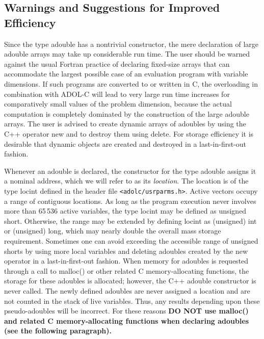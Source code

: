 \documentclass[11pt,twoside]{article}
\begin{document}
\subsection{Warnings and Suggestions for Improved Efficiency}
\label{WarSug}
%
Since the type {\sf adouble} has a nontrivial constructor,
the mere declaration of large {\sf adouble} arrays may take up
considerable run time. The user should be warned against
the usual Fortran practice of declaring fixed-size arrays
that can accommodate the largest possible case of an evaluation program
with variable dimensions. If such programs are converted to or written
in C, the overloading in combination with ADOL-C will lead to very
large run time increases for comparatively small values of the
problem dimension, because the actual computation is completely
dominated by the construction of the large {\sf adouble} arrays.
The user is advised to 
create dynamic arrays of
{\sf adouble}s by using the C++ operator {\sf new} and to destroy them
using {\sf delete}. For storage efficiency it is desirable that
dynamic objects are created and destroyed in a last-in-first-out
fashion. 

Whenever an {\sf adouble} is declared, the constructor for the type
{\sf adouble} assigns it a nominal address, which we will refer to as
its  {\em location}.  The location is of the type {\sf locint} defined
in the header file \verb=<adolc/usrparms.h>=. Active vectors occupy
a range of contiguous locations. As long as the program execution
never involves more than 65$\,$536 active variables, the type {\sf locint}
may be defined as {\sf unsigned short}. Otherwise, the range may be
extended by defining {\sf locint} as {\sf (unsigned) int} or
{\sf (unsigned) long}, which may nearly double
the overall mass storage requirement. Sometimes one can avoid exceeding
the accessible range of {\sf unsigned short}s by using more local variables and deleting
{\sf adouble}s  created by the new operator in a
last-in-first-out
fashion.  When memory for {\sf adouble}s is requested through a call to
{\sf malloc()} or other related C memory-allocating
functions, the storage for these {\sf adouble}s is allocated; however, the
C++ {\sf adouble} constructor is never called.  The newly defined
{\sf adouble}s are never assigned a location and are not counted in
the stack of live variables. Thus, any results depending upon these
pseudo-{\sf adouble}s will be incorrect. For these reasons {\bf DO NOT use
  malloc() and related C memory-allocating 
functions when declaring adoubles (see the following paragraph).}
%
%
\end{document}
